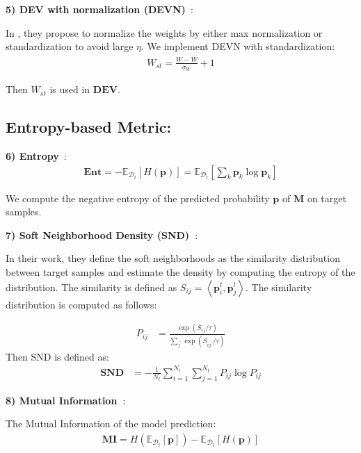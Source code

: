 \textbf{5) DEV with normalization (DEVN)}~\cite{ThreeNV}:

In \cite{ThreeNV}, they propose to normalize the weights by either max normalization or standardization to avoid large $\eta$. We implement DEVN with standardization:
\begin{align}
W_{s t}=\frac{W-\bar{W}}{\sigma_W}+1
\end{align}

Then $W_{s t}$ is used in $\boldsymbol{DEV}$.

\subsection{Entropy-based Metric:} 

\textbf{6) Entropy}~\cite{C-Ent,ADVENT}:
\begin{align}
    \boldsymbol{Ent} = -\mathbb{E}_{\mathcal{D}_t}[H(\boldsymbol{p})]=\mathbb{E}_{\mathcal{D}_t}[\sum_k \boldsymbol{p}_k\log \boldsymbol{p}_k]\nonumber
\end{align}

We compute the negative entropy of the predicted probability $\boldsymbol{p}$ of $\boldsymbol{M}$ on target samples.

\textbf{7) Soft Neighborhood Density
(SND)~\cite{SND}}:

In their work, they define the soft neighborhoods as the similarity distribution between target samples and estimate the density by computing the entropy of the distribution. The similarity is defined as $S_{i j}=\left\langle\boldsymbol{p}_i^t, \boldsymbol{p}_j^t\right\rangle$. The similarity distribution is computed as follows:

\begin{align}
P_{i j}&=\frac{\exp \left(S_{i j} / \tau\right)}{\sum_{j^{\prime}} \exp \left(S_{i j^{\prime}} / \tau\right)}
\end{align}
Then SND is defined as:
\begin{align}
\boldsymbol{SND}&=-\frac{1}{N_t} \sum_{i=1}^{N_t} \sum_{j=1}^{N_t} P_{i j} \log P_{i j}
\end{align}

\textbf{8) Mutual Information~\cite{MI}}:

The Mutual Information of the model prediction:
\begin{align}
    \boldsymbol{MI} = H(\mathbb{E}_{\mathcal{D}_t}[\boldsymbol{p}])-\mathbb{E}_{\mathcal{D}_t}[H(\boldsymbol{p})]\nonumber
\end{align}


